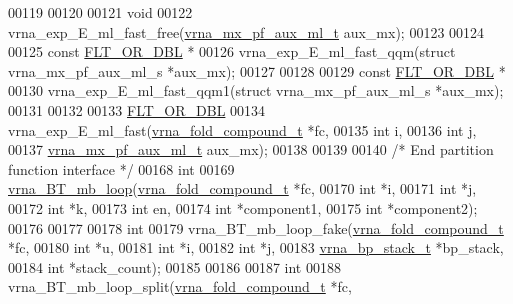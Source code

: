 \begin{DoxyCode}
00119 
00120 
00121 \textcolor{keywordtype}{void}
00122 vrna\_exp\_E\_ml\_fast\_free(\hyperlink{group__eval__loops__mb_ga39a8cc1385dcb542a60a9393cde6a1e3}{vrna\_mx\_pf\_aux\_ml\_t} aux\_mx);
00123 
00124 
00125 \textcolor{keyword}{const} \hyperlink{group__data__structures_ga31125aeace516926bf7f251f759b6126}{FLT\_OR\_DBL} *
00126 vrna\_exp\_E\_ml\_fast\_qqm(\textcolor{keyword}{struct} vrna\_mx\_pf\_aux\_ml\_s *aux\_mx);
00127 
00128 
00129 \textcolor{keyword}{const} \hyperlink{group__data__structures_ga31125aeace516926bf7f251f759b6126}{FLT\_OR\_DBL} *
00130 vrna\_exp\_E\_ml\_fast\_qqm1(\textcolor{keyword}{struct} vrna\_mx\_pf\_aux\_ml\_s *aux\_mx);
00131 
00132 
00133 \hyperlink{group__data__structures_ga31125aeace516926bf7f251f759b6126}{FLT\_OR\_DBL}
00134 vrna\_exp\_E\_ml\_fast(\hyperlink{group__fold__compound_structvrna__fc__s}{vrna\_fold\_compound\_t} *fc,
00135                    \textcolor{keywordtype}{int}                  i,
00136                    \textcolor{keywordtype}{int}                  j,
00137                    \hyperlink{group__eval__loops__mb_ga39a8cc1385dcb542a60a9393cde6a1e3}{vrna\_mx\_pf\_aux\_ml\_t}  aux\_mx);
00138 
00139 
00140 \textcolor{comment}{/* End partition function interface */}
00168 \textcolor{keywordtype}{int}
00169 \hyperlink{group__mfe__backtracking_ga5b62d56c9d47c1e8792b02cd6b95e78b}{vrna\_BT\_mb\_loop}(\hyperlink{group__fold__compound_structvrna__fc__s}{vrna\_fold\_compound\_t}  *fc,
00170                 \textcolor{keywordtype}{int}                   *i,
00171                 \textcolor{keywordtype}{int}                   *j,
00172                 \textcolor{keywordtype}{int}                   *k,
00173                 \textcolor{keywordtype}{int}                   en,
00174                 \textcolor{keywordtype}{int}                   *component1,
00175                 \textcolor{keywordtype}{int}                   *component2);
00176 
00177 
00178 \textcolor{keywordtype}{int}
00179 vrna\_BT\_mb\_loop\_fake(\hyperlink{group__fold__compound_structvrna__fc__s}{vrna\_fold\_compound\_t} *fc,
00180                      \textcolor{keywordtype}{int}                  *u,
00181                      \textcolor{keywordtype}{int}                  *i,
00182                      \textcolor{keywordtype}{int}                  *j,
00183                      \hyperlink{group__data__structures_structvrna__bp__stack__s}{vrna\_bp\_stack\_t}      *bp\_stack,
00184                      \textcolor{keywordtype}{int}                  *stack\_count);
00185 
00186 
00187 \textcolor{keywordtype}{int}
00188 vrna\_BT\_mb\_loop\_split(\hyperlink{group__fold__compound_structvrna__fc__s}{vrna\_fold\_compound\_t}  *fc,

\end{DoxyCode}

